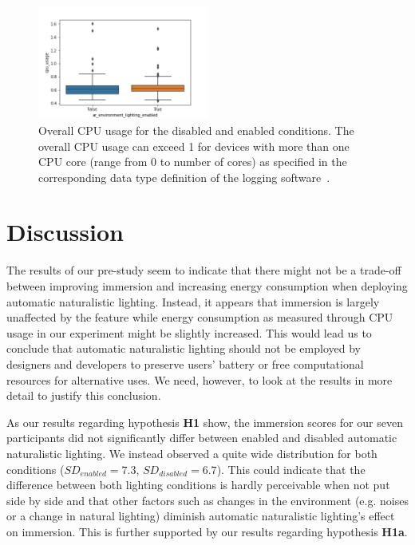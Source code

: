 \documentclass[12pt,twoside,english]{article}
\begin{document}
\begin{figure}[h]
    \centering
    \includegraphics[width=0.5\textwidth]{imgs/cpu_raw_plot}
    \caption{Overall \gls{CPU} usage for the disabled and enabled conditions. The overall \gls{CPU} usage can exceed 1 for devices with more than one \gls{CPU} core (range from 0 to number of cores) as specified in the corresponding data type definition of the logging software~\cite{apple_system_2020}.}
    \label{fig:cpu_raw_plot}
\end{figure}


\section{Discussion}
\label{sect:discussion}

The results of our pre-study seem to indicate that there might not be a trade-off between improving immersion and increasing energy consumption when deploying automatic naturalistic lighting.
Instead, it appears that immersion is largely unaffected by the feature while energy consumption as measured through \gls{CPU} usage in our experiment might be slightly increased.
This would lead us to conclude that automatic naturalistic lighting should not be employed by designers and developers to preserve users' battery or free computational resources for alternative uses.
We need, however, to look at the results in more detail to justify this conclusion.

As our results regarding hypothesis \textbf{H1} show, the immersion scores for our seven participants did not significantly differ between enabled and disabled automatic naturalistic lighting.
We instead observed a quite wide distribution for both conditions ($ SD_{enabled} = 7.3 $, $ SD_{disabled} = 6.7 $).
This could indicate that the difference between both lighting conditions is hardly perceivable when not put side by side and that other factors such as changes in the environment (e.g. noises or a change in natural lighting) diminish automatic naturalistic lighting's effect on immersion.
This is further supported by our results regarding hypothesis \textbf{H1a}.
\end{document}
